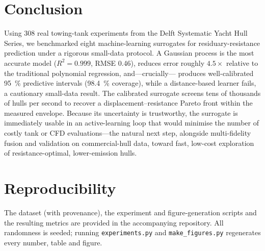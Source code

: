 \documentclass[conference]{IEEEtran}
\begin{document}
\section{Conclusion}
\label{sec:conclusion}

Using \num{308} real towing-tank experiments from the Delft Systematic Yacht Hull
Series, we benchmarked eight machine-learning surrogates for residuary-resistance
prediction under a rigorous small-data protocol. A Gaussian process is the most
accurate model ($R^{2}=\num{0.999}$, RMSE \num{0.46}), reduces error roughly
$4.5\times$ relative to the traditional polynomial regression, and---crucially---
produces well-calibrated \SI{95}{\percent} predictive intervals
(\SI{98.4}{\percent} coverage), while a distance-based learner fails, a
cautionary small-data result. The calibrated surrogate screens tens of thousands
of hulls per second to recover a displacement--resistance Pareto front within the
measured envelope. Because its uncertainty is trustworthy, the surrogate is
immediately usable in an active-learning loop that would minimise the number of
costly tank or CFD evaluations---the natural next step, alongside multi-fidelity
fusion and validation on commercial-hull data, toward fast, low-cost exploration
of resistance-optimal, lower-emission hulls.

\section*{Reproducibility}
The dataset (with provenance), the experiment and figure-generation scripts and
the resulting metrics are provided in the accompanying repository. All
randomness is seeded; running \texttt{experiments.py} and
\texttt{make\_figures.py} regenerates every number, table and figure.
\end{document}
